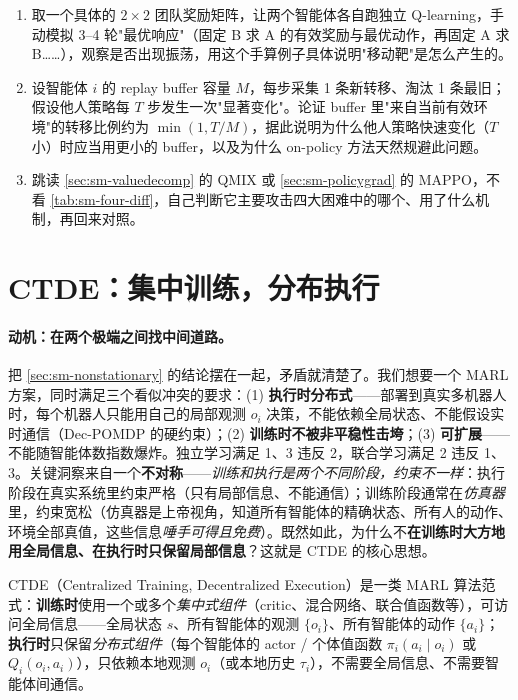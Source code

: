 \begin{practice}
\begin{enumerate}
  \item 取一个具体的 $2\times2$ 团队奖励矩阵，让两个智能体各自跑独立 Q-learning，手动模拟 3--4 轮"最优响应"（固定 B 求 A 的有效奖励与最优动作，再固定 A 求 B……），观察是否出现振荡，用这个手算例子具体说明"移动靶"是怎么产生的。
  \item 设智能体 $i$ 的 replay buffer 容量 $M$，每步采集 1 条新转移、淘汰 1 条最旧；假设他人策略每 $T$ 步发生一次"显著变化"。论证 buffer 里"来自当前有效环境"的转移比例约为 $\min(1,T/M)$，据此说明为什么他人策略快速变化（$T$ 小）时应当用更小的 buffer，以及为什么 on-policy 方法天然规避此问题。
  \item 跳读 \cref{sec:sm-valuedecomp} 的 QMIX 或 \cref{sec:sm-policygrad} 的 MAPPO，不看 \cref{tab:sm-four-diff}，自己判断它主要攻击四大困难中的哪个、用了什么机制，再回来对照。
\end{enumerate}
\end{practice}

\section{CTDE：集中训练，分布执行}
\label{sec:sm-ctde}

\paragraph{动机：在两个极端之间找中间道路。}
把 \cref{sec:sm-nonstationary} 的结论摆在一起，矛盾就清楚了。我们想要一个 MARL 方案，同时满足三个看似冲突的要求：(1) \textbf{执行时分布式}——部署到真实多机器人时，每个机器人只能用自己的局部观测 $o_i$ 决策，不能依赖全局状态、不能假设实时通信（Dec-POMDP 的硬约束）；(2) \textbf{训练时不被非平稳性击垮}；(3) \textbf{可扩展}——不能随智能体数指数爆炸。独立学习满足 1、3 违反 2，联合学习满足 2 违反 1、3。关键洞察来自一个\textbf{不对称}——\emph{训练和执行是两个不同阶段，约束不一样}：执行阶段在真实系统里约束严格（只有局部信息、不能通信）；训练阶段通常在\emph{仿真器}里，约束宽松（仿真器是上帝视角，知道所有智能体的精确状态、所有人的动作、环境全部真值，这些信息\emph{唾手可得且免费}）。既然如此，为什么不\textbf{在训练时大方地用全局信息、在执行时只保留局部信息}？这就是 CTDE 的核心思想。

\begin{definition}\label{def:sm-ctde}
CTDE（Centralized Training, Decentralized Execution）是一类 MARL 算法范式：\textbf{训练时}使用一个或多个\emph{集中式组件}（critic、混合网络、联合值函数等），可访问全局信息——全局状态 $s$、所有智能体的观测 $\{o_i\}$、所有智能体的动作 $\{a_i\}$；\textbf{执行时}只保留\emph{分布式组件}（每个智能体的 actor / 个体值函数 $\pi_i(a_i\mid o_i)$ 或 $Q_i(o_i,a_i)$），只依赖本地观测 $o_i$（或本地历史 $\tau_i$），不需要全局信息、不需要智能体间通信。
\end{definition}

